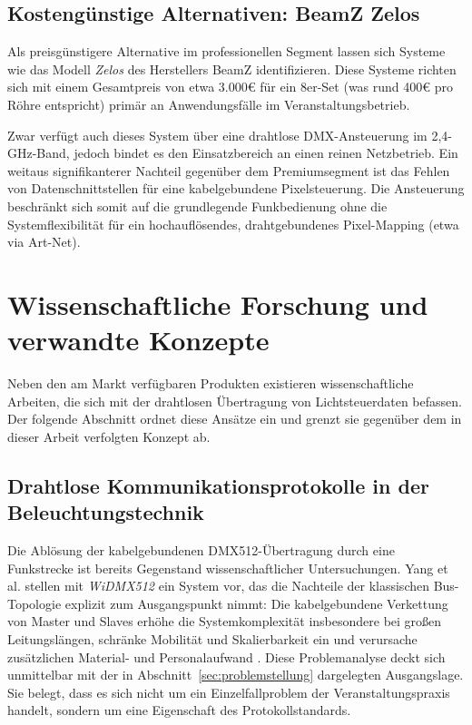\subsection{Kostengünstige Alternativen: BeamZ Zelos}
Als preisgünstigere Alternative im professionellen Segment lassen sich 
Systeme wie das Modell \textit{Zelos} des Herstellers BeamZ identifizieren. 
Diese Systeme richten sich mit einem Gesamtpreis von etwa 3.000€ für 
ein 8er-Set (was rund 400€ pro Röhre entspricht) primär an Anwendungsfälle 
im Veranstaltungsbetrieb. 

Zwar verfügt auch dieses System über eine drahtlose DMX-Ansteuerung im 
2,4-GHz-Band, jedoch bindet es den Einsatzbereich an einen reinen Netzbetrieb.
Ein weitaus signifikanterer Nachteil gegenüber dem 
Premiumsegment ist das Fehlen von Datenschnittstellen für eine kabelgebundene 
Pixelsteuerung. Die Ansteuerung beschränkt sich somit auf die grundlegende 
Funkbedienung ohne die Systemflexibilität für ein hochauflösendes, 
drahtgebundenes Pixel-Mapping (etwa via Art-Net).

\section{Wissenschaftliche Forschung und verwandte Konzepte}
\label{sec:wissenschaftliche-forschung}

Neben den am Markt verfügbaren Produkten existieren wissenschaftliche Arbeiten,
die sich mit der drahtlosen Übertragung von Lichtsteuerdaten befassen. Der
folgende Abschnitt ordnet diese Ansätze ein und grenzt sie gegenüber dem in
dieser Arbeit verfolgten Konzept ab.

\subsection{Drahtlose Kommunikationsprotokolle in der Beleuchtungstechnik}
\label{subsec:forschung-kommunikation}

Die Ablösung der kabelgebundenen DMX512-Übertragung durch eine Funkstrecke ist
bereits Gegenstand wissenschaftlicher Untersuchungen. Yang et al. stellen mit
\textit{WiDMX512} ein System vor, das die Nachteile der klassischen
Bus-Topologie explizit zum Ausgangspunkt nimmt: Die kabelgebundene Verkettung
von Master und Slaves erhöhe die Systemkomplexität insbesondere bei großen
Leitungslängen, schränke Mobilität und Skalierbarkeit ein und verursache
zusätzlichen Material- und Personalaufwand \cite{yang2015real}. Diese
Problemanalyse deckt sich unmittelbar mit der in
Abschnitt~\ref{sec:problemstellung} dargelegten Ausgangslage. Sie belegt, dass
es sich nicht um ein Einzelfallproblem der Veranstaltungspraxis handelt, sondern
um eine Eigenschaft des Protokollstandards.

